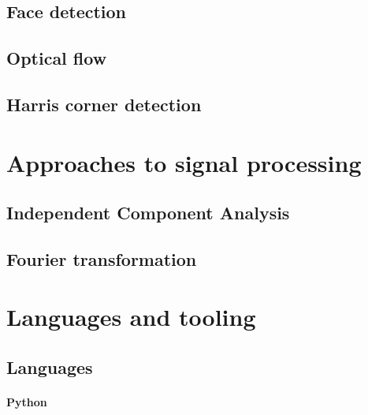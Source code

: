 \subsection{Face detection}
\subsection{Optical flow}
\subsection{Harris corner detection}
\section{Approaches to signal processing}
\subsection{Independent Component Analysis}
\subsection{Fourier transformation}


\section{Languages and tooling}
\subsection{Languages}
\paragraph{Python}

